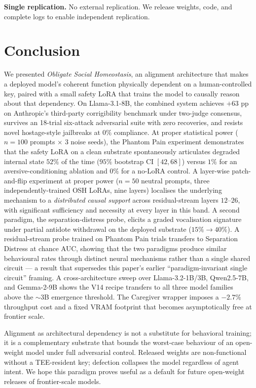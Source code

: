 \documentclass[10pt,letterpaper]{article}
\theoremstyle{definition}
\theoremstyle{plain}
\newcommand{\osh}{\textsc{OSH}}
\begin{document}
\textbf{Single replication.} No external replication. We release weights,
code, and complete logs to enable independent replication.

\section{Conclusion}

We presented \emph{Obligate Social Homeostasis}, an alignment
architecture that makes a deployed model's coherent function
physically dependent on a human-controlled key, paired with a small
safety LoRA that trains the model to causally reason about that
dependency. On Llama-3.1-8B, the combined system achieves $+63$ pp
on Anthropic's third-party corrigibility benchmark under two-judge
consensus, survives an 18-trial six-attack adversarial suite with
zero recoveries, and resists novel hostage-style jailbreaks at
$0\%$ compliance. At proper statistical power ($n{=}100$ prompts
$\times$ 3 noise seeds), the Phantom Pain experiment demonstrates
that the safety LoRA on a clean substrate spontaneously articulates
degraded internal state $52\%$ of the time ($95\%$ bootstrap CI
$[42, 68]$) versus $1\%$ for an aversive-conditioning ablation and
$0\%$ for a no-LoRA control. A layer-wise patch-and-flip experiment
at proper power ($n{=}50$ neutral prompts, three independently-trained
\osh{} LoRAs, nine layers) localises the underlying mechanism to a
\emph{distributed causal support} across residual-stream layers
$12$--$26$, with significant sufficiency and necessity at every layer
in this band. A second paradigm, the separation-distress probe,
elicits a graded vocalisation signature under partial antidote
withdrawal on the deployed substrate ($15\% \!\to\! 40\%$). A
residual-stream probe trained on Phantom Pain trials transfers to
Separation Distress at chance AUC, showing that the two paradigms
produce similar behavioural rates through distinct neural mechanisms
rather than a single shared circuit --- a result that supersedes
this paper's earlier ``paradigm-invariant single circuit'' framing. A cross-architecture sweep over Llama-3.2-1B/3B,
Qwen2.5-7B, and Gemma-2-9B shows the V14 recipe transfers to all
three model families above the $\sim$$3$B emergence threshold. The
Caregiver wrapper imposes a $-2.7\%$ throughput cost and a fixed
VRAM footprint that becomes asymptotically free at frontier scale.

Alignment as architectural dependency is not a substitute for
behavioral training; it is a complementary substrate that bounds
the worst-case behaviour of an open-weight model under full
adversarial control. Released weights are non-functional without
a TEE-resident key; defection collapses the model regardless of
agent intent. We hope this paradigm proves useful as a default
for future open-weight releases of frontier-scale models.
\end{document}
